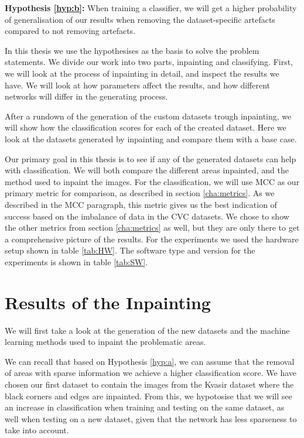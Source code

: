 \noindent 
\textbf{Hypothesis \ref{hyp:b}:}
When training a classifier, we will get a higher probability of generalisation of our results when removing the dataset-specific artefacts compared to not removing artefacts.
\vspace{5px}

In this thesis we use the hypothesises as the basis to solve the problem statements. 
We divide our work into two parts, inpainting and classifying. 
First, we will look at the process of inpainting in detail, and inspect the results we have.  
We will look at how parameters affect the results, and how different networks will differ in the generating process.


After a rundown of the generation of the custom datasets trough inpainting, we will show how the classification scores for each of the created dataset. Here we look at the datasets generated by inpainting and compare them with a base case. 

Our primary goal in this thesis is to see if any of the generated datasets can help with classification. We will both compare the different areas inpainted, and the method used to inpaint the images. 
For the classification, we will use MCC as our primary metric for comparison, as described in section \ref{cha:metrics}. As we described in the MCC paragraph, this metric gives us the best indication of success based on the imbalance of data in the CVC datasets. We chose to show the other metrics from section \ref{cha:metrics} as well, but they are only there to get a comprehensive picture of the results.
For the experiments we used the hardware setup shown in table \ref{tab:HW}.
The software type and version for the experiments is shown in table \ref{tab:SW}.





\section{Results of the Inpainting}
We will first take a look at the generation of the new datasets and the machine learning methods used to inpaint the problematic areas.

We can recall that based on  Hypothesis \ref{hyp:a}, we can assume that the removal of areas with sparse information we achieve a higher classification score. We have chosen our first dataset to contain the images from the Kvasir dataset where the black corners and edges are inpainted. 
From this, we hypotosise that we will see an increase in classification when training and testing on the same dataset, as well when testing on a new dataset, given that the network has less sparseness to take into account. 

